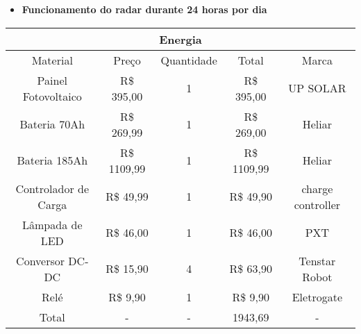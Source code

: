 \begin{itemize}
    \item \textbf{Funcionamento do radar durante 24 horas por dia}
\end{itemize}

\begin{table}[H]
\begin{tabular}{|c|c|c|c|c|}
\hline
\multicolumn{5}{|c|}{Energia}                                                 \\ \hline
Material             & Preço         & Quantidade & Total         & Marca     \\ \hline
Painel Fotovoltaico  & R\$ 395,00  & 1          & R\$ 395,00  & UP SOLAR    \\ \hline
Bateria 70Ah             & R\$ 269,99  & 1          & R\$ 269,00  & Heliar  \\ \hline
Bateria 185Ah             & R\$ 1109,99  & 1          & R\$ 1109,99  & Heliar  \\ \hline
Controlador de Carga & R\$ 49,99  & 1          & R\$ 49,90  & charge controller \\ \hline
Lâmpada de LED       & R\$ 46,00 & 1          & R\$ 46,00 & PXT         \\ \hline
Conversor DC-DC       & R\$ 15,90 & 4          & R\$ 63,90 & Tenstar Robot         \\ \hline
Relé       & R\$ 9,90 & 1          & R\$ 9,90 & Eletrogate         \\ \hline
Total & - & - & 1943,69 & - \\ \hline
\end{tabular}
\end{table}



